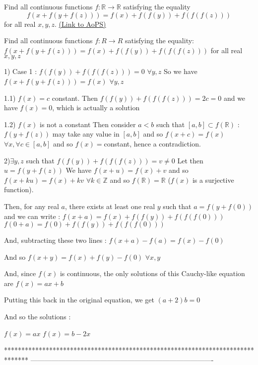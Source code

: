\begin{problem}
	Find all continuous functions $f: \mathbb R \to \mathbb R$ satisfying the equality
\[ f(x+f(y+f(z)))=f(x)+f(f(y))+f(f(f(z)))\] for all real $ x,y,z$.
	\flushright \href{https://artofproblemsolving.com/community/c6h219275}{(Link to AoPS)}
\end{problem}



\begin{solution}
	\begin{tcolorbox}Find all continuous functions $ f: R\rightarrow R$ satisfying the equality:
$ f(x + f(y + f(z))) = f(x) + f(f(y)) + f(f(f(z)))$ for all real $ x,y,z$\end{tcolorbox}

1) Case 1 : $ f(f(y))+f(f(f(z)))=0$ $ \forall y,z$
So we have $ f(x+f(y+f(z)))=f(x)$ $ \forall y,z$

1.1) $ f(x)=c$ constant.
Then $ f(f(y))+f(f(f(z)))=2c=0$ and we have $ f(x)=0$, which is actually a solution

1.2) $ f(x)$ is not a constant
Then consider $ a<b$ such that $ [a,b]\subset f(\mathbb R)$ : $ f(y+f(z))$ may take any value in $ [a,b]$ and so $ f(x+c)=f(x)$ $ \forall x,\forall c\in[a,b]$ and so $ f(x)=$constant, hence a contradiction.

2)$ \exists y,z$ such that $ f(f(y))+f(f(f(z)))=v\neq 0$
Let then $ u=f(y+f(z))$
We have $ f(x+u)=f(x)+v$ and so $ f(x+ku)=f(x)+kv$ $ \forall k\in\mathbb Z$ and so $ f(\mathbb R)=\mathbb R$ ($ f(x)$ is a surjective function).

Then, for any real $ a$, there exists at least one real $ y$ such that $ a=f(y+f(0))$ and we can write :
$ f(x+a)=f(x)+f(f(y))+f(f(f(0)))$
$ f(0+a)=f(0)+f(f(y))+f(f(f(0)))$

And, subtracting these two lines : $ f(x+a)-f(a)=f(x)-f(0)$

And so $ f(x+y)=f(x)+f(y)-f(0)$ $ \forall x,y$

And, since $ f(x)$ is continuous, the only solutions of this Cauchy-like equation are $ f(x)=ax+b$

Putting this back in the original equation, we get $ (a+2)b=0$

And so the solutions :

$ f(x)=ax$
$ f(x)=b-2x$
\end{solution}
*******************************************************************************
-------------------------------------------------------------------------------


